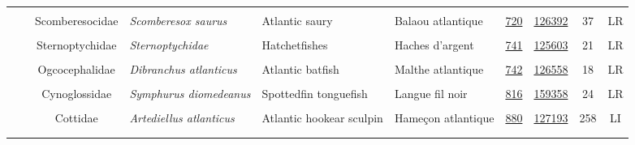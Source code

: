\documentclass[12pt]{article}\usepackage[]{graphicx}\usepackage[]{color}
\begin{document}
\begin{landscapepage}
\begin{longtable}[t]{ccc>{\centering\arraybackslash}p{3cm}>{\centering\arraybackslash}p{3cm}>{\centering\arraybackslash}p{3cm}>{}c>{}ccc}
\nopagebreak
\addlinespace[0.3em]
\\
\hspace{1em}\hspace{1em} &  & Scomberesocidae & \em{Scomberesox saurus} & Atlantic saury & Balaou atlantique & \href{#sec:720}{720} & \href{http://www.marinespecies.org/aphia.php?p=taxdetails&id=126392}{126392} & 37 & LR\\
\nopagebreak
\addlinespace[0.3em]
\\
\hspace{1em}\hspace{1em} &  & Sternoptychidae & \em{Sternoptychidae} & Hatchetfishes & Haches d'argent & \href{#sec:741}{741} & \href{http://www.marinespecies.org/aphia.php?p=taxdetails&id=125603}{125603} & 21 & LR\\
\nopagebreak
\addlinespace[0.3em]
\\
\hspace{1em}\hspace{1em} &  & Ogcocephalidae & \em{Dibranchus atlanticus} & Atlantic batfish & Malthe atlantique & \href{#sec:742}{742} & \href{http://www.marinespecies.org/aphia.php?p=taxdetails&id=126558}{126558} & 18 & LR\\
\nopagebreak
\addlinespace[0.3em]
\\
\hspace{1em}\hspace{1em} &  & Cynoglossidae & \em{Symphurus diomedeanus} & Spottedfin tonguefish & Langue fil noir & \href{#sec:816}{816} & \href{http://www.marinespecies.org/aphia.php?p=taxdetails&id=159358}{159358} & 24 & LR\\
\nopagebreak
\addlinespace[0.3em]
\\
\hspace{1em}\hspace{1em} &  & Cottidae & \em{Artediellus atlanticus} & Atlantic hookear sculpin & Hameçon atlantique & \href{#sec:880}{880} & \href{http://www.marinespecies.org/aphia.php?p=taxdetails&id=127193}{127193} & 258 & LI\\
\pagebreak[0]
\addlinespace[0.3em]
\\
\addlinespace[0.3em]
\\

\end{longtable}
\end{landscapepage}
\end{document}
